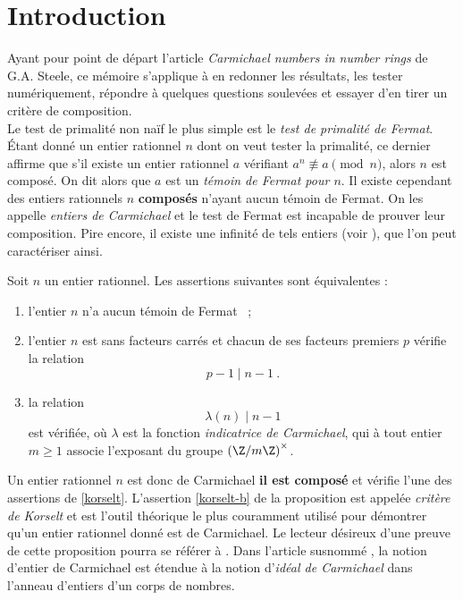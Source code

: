 \section*{Introduction}

Ayant pour point de départ l'article \textit{Carmichael numbers in number rings} \cite{article} de G.A. Steele, ce mémoire s'applique à en redonner les résultats, les tester numériquement, répondre à quelques questions soulevées et essayer d'en tirer un critère de composition. \\

Le test de primalité non naïf le plus simple est le \emph{test de primalité de Fermat}. Étant donné un entier rationnel $n$ dont on veut tester la primalité, ce dernier affirme que s'il existe un entier rationnel $a$ vérifiant $a^n \not \equiv a \pmod{n}$, alors $n$ est composé. On dit alors que $a$ est un \emph{témoin de Fermat pour $n$}. Il existe cependant des entiers rationnels $n$ \textbf{composés} n'ayant aucun témoin de Fermat. On les appelle \emph{entiers de Carmichael} et le test de Fermat est incapable de prouver leur composition. Pire encore, il existe une infinité de tels entiers (voir \cite{InfiniteCarmichael}), que l'on peut caractériser ainsi.

\begin{proposition}\label{korselt} Soit $n$ un entier rationnel. Les assertions suivantes sont équivalentes :
	\begin{enumerate}
		\item l'entier $n$ n'a aucun témoin de Fermat ~;
		\item l'entier $n$ est sans facteurs carrés et chacun de ses facteurs premiers $p$ vérifie la relation \[p-1 \mid n-1 ~.\] \label{korselt-b}
		\item la relation \[\lambda(n) \mid n-1\] est vérifiée, où $\lambda$ est la fonction \emph{indicatrice de Carmichael}, qui à tout entier $m\geq1$ associe l'exposant du groupe $\left(\Z/m\Z\right)^\times$.
	\end{enumerate}
\end{proposition}

Un entier rationnel $n$ est donc de Carmichael \ssi \textbf{il est composé} et vérifie l'une des assertions de \ref{korselt}. L'assertion \ref{korselt-b} de la proposition est appelée \textit{critère de Korselt} et est l'outil théorique le plus couramment utilisé pour démontrer qu'un entier rationnel donné est de Carmichael. Le lecteur désireux d'une preuve de cette proposition pourra se référer à \cite[§3.3 p. 89]{Demazure}. Dans l'article susnommé \cite{article}, la notion d'entier de Carmichael est étendue à la notion d'\emph{idéal de Carmichael} dans l'anneau d'entiers d'un corps de nombres. 

